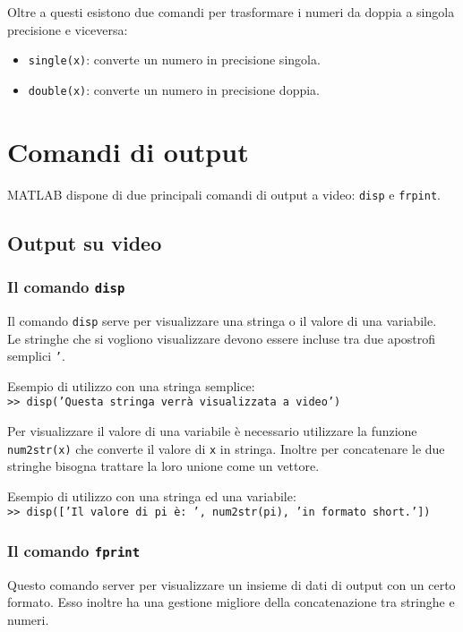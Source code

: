 \documentclass[12pt,a4paper,oneside]{book}
\begin{document}
Oltre a questi esistono due comandi per trasformare i numeri da doppia a singola precisione e viceversa:
\begin{itemize}

	\item	\texttt{single(x)}: converte un numero in precisione singola.
	
	\item 	\texttt{double(x)}: converte un numero in precisione doppia.

\end{itemize}
	

\newpage

\chapter{Comandi di output}
MATLAB dispone di due principali comandi di output a video: \texttt{disp} e \texttt{frpint}.
\section{Output su video}
\subsection{Il comando \texttt{disp}}
Il comando \texttt{disp} serve per visualizzare una stringa o il valore di una variabile. \\
Le stringhe che si vogliono visualizzare devono essere incluse tra due apostrofi semplici \texttt{'}.
\break
			
Esempio di utilizzo con una stringa semplice: \\
\texttt{>> disp('Questa stringa verrà visualizzata a video')} 
\break
			
Per visualizzare il valore di una variabile è necessario utilizzare la funzione \texttt{num2str(x)} che converte il valore di \texttt{x} in stringa. Inoltre per concatenare le due stringhe bisogna trattare la loro unione come un vettore. 
\break
			
Esempio di utilizzo con una stringa ed una variabile: \\
\texttt{>> disp(['Il valore di pi è: ', num2str(pi), 'in formato short.'])}

\subsection{Il comando \texttt{fprint}}
Questo comando server per visualizzare un insieme di dati di output con un certo formato. Esso inoltre ha una gestione migliore della concatenazione tra stringhe e numeri.
\break
			
\end{document}
